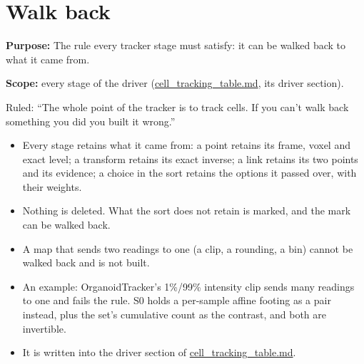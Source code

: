 \chapter{\texorpdfstring{Walk back}{Walk back}}
\label{chap:walk-back}

\textbf{Purpose:} The rule every tracker stage must satisfy: it can be walked back to what it came from.

\textbf{Scope:} every stage of the driver (\hyperref[chap:cell-tracking-table]{cell\_\allowbreak{}tracking\_\allowbreak{}table.md}, its driver section).

Ruled: “The whole point of the tracker is to track cells. If you can't walk back something you did you built it wrong.”

\begin{itemize}
\item Every stage retains what it came from: a point retains its frame, voxel and exact level; a transform retains its exact inverse; a link retains its two points and its evidence; a choice in the sort retains the options it passed over, with their weights.
\item Nothing is deleted. What the sort does not retain is marked, and the mark can be walked back.
\item A map that sends two readings to one (a clip, a rounding, a bin) cannot be walked back and is not built.
\item An example: OrganoidTracker's 1\%/99\% intensity clip sends many readings to one and fails the rule. S0 holds a per-sample affine footing as a pair instead, plus the set's cumulative count as the contrast, and both are invertible.
\item It is written into the driver section of \hyperref[chap:cell-tracking-table]{cell\_\allowbreak{}tracking\_\allowbreak{}table.md}.
\end{itemize}
